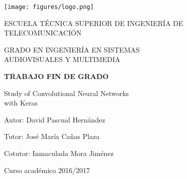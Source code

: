 \begin{titlepage}
	
	\begin{center}
		\vspace*{7.7mm}
		\begin{center}
			\texttt{[image: figures/logo.png]}
		\end{center}
		\vspace{6.5mm}
		
		\fontsize{15.5}{14}\selectfont ESCUELA TÉCNICA SUPERIOR DE INGENIERÍA DE TELECOMUNICACIÓN
		\vspace{13mm}
		
		\fontsize{14}{14}\selectfont GRADO EN INGENIERÍA EN SISTEMAS \\ AUDIOVISUALES Y MULTIMEDIA

		\vspace{70pt}
		
		\fontsize{15.7}{14}\selectfont \textbf{TRABAJO FIN DE GRADO} 
		
		\vspace{25mm}
		\begin{huge}
			 Study of Convolutional Neural Networks\\ with Keras
		\end{huge}
		
		\vspace{25mm}
		
		\begin{large}
			Autor: David Pascual Hernández
			
			Tutor: José María Cañas Plaza
			
			Cotutor: Inmaculada Mora Jiménez 
			
			\vspace{10mm}
		\end{large}
		\begin{normalsize}
			Curso académico 2016/2017		
		\end{normalsize}
		\vspace{10mm}
		
	\end{center}
	
\end{titlepage}

\pagebreak
\thispagestyle{empty}
\vspace*{12cm}

